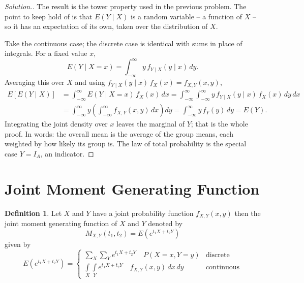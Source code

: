 \documentclass[12pt,a4paper]{report}
\theoremstyle{definition}
\newtheorem{definition}[thm]{Definition}
\theoremstyle{plain}
\theoremstyle{definition}
\newenvironment{solution}
  {\renewcommand{\qedsymbol}{}\begin{proof}[\textit{Solution}.]}
  {\end{proof}}
\begin{document}
\begin{solution}
The result is the tower property used in the previous problem. The point to keep hold of
is that $E(Y\mid X)$ is a random variable -- a function of $X$ -- so it has an
expectation of its own, taken over the distribution of $X$.

Take the continuous case; the discrete case is identical with sums in place of integrals.
For a fixed value $x$,
\[E(Y\mid X=x) = \int_{-\infty}^{\infty} y\,f_{Y\mid X}(y\mid x)\,dy.\]
Averaging this over $X$ and using $f_{Y\mid X}(y\mid x)\,f_X(x) = f_{X,Y}(x,y)$,
\begin{align*}
E[E(Y\mid X)] &= \int_{-\infty}^{\infty} E(Y\mid X=x)\,f_X(x)\,dx
 = \int_{-\infty}^{\infty}\int_{-\infty}^{\infty} y\,f_{Y\mid X}(y\mid x)\,f_X(x)\,dy\,dx\\
&= \int_{-\infty}^{\infty} y\left(\int_{-\infty}^{\infty} f_{X,Y}(x,y)\,dx\right)dy
 = \int_{-\infty}^{\infty} y\,f_Y(y)\,dy = E(Y).
\end{align*}
Integrating the joint density over $x$ leaves the marginal of $Y$; that is the whole proof.
In words: the overall mean is the average of the group means, each weighted by how likely
its group is. The law of total probability is the special case $Y = I_A$, an indicator.
\end{solution}


\section{Joint Moment Generating Function}
\begin{definition}
Let $X$ and $Y$ have a joint probability function $f_{X,Y}(x,y)$ then the joint moment generating function of $X$ and $Y$ denoted by \[M_{X,Y}(t_1,t_2)=E\left(e^{t_1X +t_2Y}\right)\]
given by 
\[E\left(e^{\displaystyle{t_1X + t_2Y}}\right)=
\begin{cases}
\sum\limits_X\sum\limits_Ye^{\displaystyle{t_1X + t_2Y}}\quad P (X=x,Y=y) & \text{discrete}\\[1ex]
\int\limits_X\int\limits_Ye^{\displaystyle{t_1X + t_2Y}}\quad f_{X,Y}(x,y)\, dx\, dy & \text{continuous}
\end{cases}
\]
\end{definition}
\end{document}

